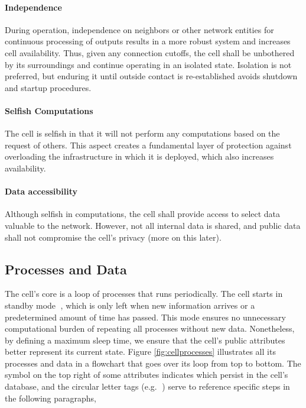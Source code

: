 \paragraph*{Independence} During operation, independence on neighbors or other network entities for continuous processing of outputs results in a more robust system and increases cell availability. Thus, given any connection cutoffs, the cell shall be unbothered by its surroundings and continue operating in an isolated state. Isolation is not preferred, but enduring it until outside contact is re-established avoids shutdown and startup procedures.

\paragraph*{Selfish Computations} The cell is selfish in that it will not perform any computations based on the request of others. This aspect creates a fundamental layer of protection against overloading the infrastructure in which it is deployed, which also increases availability.

\paragraph*{Data accessibility} Although selfish in computations, the cell shall provide access to select data valuable to the network. However, not all internal data is shared, and public data shall not compromise the cell's privacy (more on this later).

\subsection{Processes and Data}

The cell's core is a loop of processes that runs periodically. The cell starts in standby mode \textcircled{}, which is only left when new information arrives or a predetermined amount of time has passed. This mode ensures no unnecessary computational burden of repeating all processes without new data. Nonetheless, by defining a maximum sleep time, we ensure that the cell's public attributes better represent its current state. Figure \ref{fig:cellprocesses} illustrates all its processes and data in a flowchart that goes over its loop from top to bottom. The symbol on the top right of some attributes indicates which persist in the cell's database, and the circular letter tags (e.g. \textcircled{}) serve to reference specific steps in the following paragraphs,

